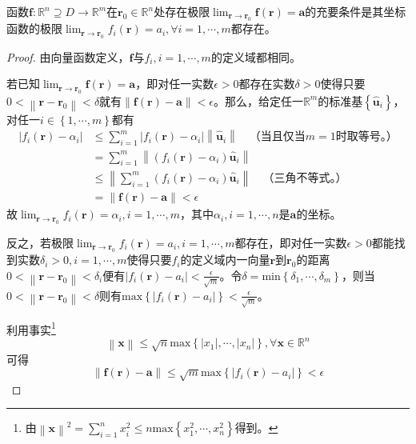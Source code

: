 \documentclass[main.tex]{subfiles}
\begin{document}
\begin{theorem}\label{thm:II.11.1}
函数$\mathbf{f}:\mathbb{R}^n\supseteq D\rightarrow\mathbb{R}^m$在$\mathbf{r}_0\in\mathbb{R}^n$处存在极限$\lim_{\mathbf{r}\to\mathbf{r}_0}\mathbf{f}\left(\mathbf{r}\right)=\mathbf{a}$的充要条件是其坐标函数的极限$\lim_{\mathbf{r}\to\mathbf{r}_0}f_i\left(\mathbf{r}\right)=a_i,\forall i=1,\cdots,m$都存在。
\end{theorem}
\begin{proof}
由向量函数定义，$\mathbf{f}$与$f_i,i=1,\cdots,m$的定义域都相同。

若已知$\lim_{\mathbf{r}\to\mathbf{r}_0}\mathbf{f}\left(\mathbf{r}\right)=\mathbf{a}$，即对任一实数$\epsilon>0$都存在实数$\delta>0$使得只要$0<\left\|\mathbf{r}-\mathbf{r}_0\right\|<\delta$就有$\left\|\mathbf{f}\left(\mathbf{r}\right)-\mathbf{a}\right\|<\epsilon$。那么，给定任一$\mathbb{R}^m$的标准基$\left\{\mathbf{\hat{u}}_i\right\}$，对任一$i\in\left\{1,\cdots,m\right\}$都有
\begin{align*}
    \left|f_i\left(\mathbf{r}\right)-\alpha_i\right|&\leq\sum_{i=1}^m\left|f_i\left(\mathbf{r}\right)-\alpha_i\right|\left\|\mathbf{\hat{u}}_i\right\|\quad\text{（当且仅当}m=1\text{时取等号。）}\\
    &=\sum_{i=1}^m\left\|\left(f_i\left(\mathbf{r}\right)-\alpha_i\right)\mathbf{\hat{u}}_i\right\|\\
    &\leq\left\|\sum_{i=1}^m\left(f_i\left(\mathbf{r}\right)-\alpha_i\right)\mathbf{\hat{u}}_i\right\|\quad\text{（三角不等式。）}\\
    &=\left\|\mathbf{f}\left(\mathbf{r}\right)-\mathbf{a}\right\|<\epsilon
\end{align*}
故$\lim_{\mathbf{r}\to\mathbf{r}_0}f_i\left(\mathbf{r}\right)=\alpha_i,i=1,\cdots,m$，其中$\alpha_i,i=1,\cdots,n$是$\mathbf{a}$的坐标。

反之，若极限$\lim_{\mathbf{r}\to\mathbf{r}_0}f_i\left(\mathbf{r}\right)=a_i,i=1,\cdots,m$都存在，即对任一实数$\epsilon>0$都能找到实数$\delta_i>0,i=1,\cdots,m$使得只要$f_i$的定义域内一向量$\mathbf{r}$到$\mathbf{r}_0$的距离$0<\left\|\mathbf{r}-\mathbf{r}_0\right\|<\delta_i$便有$\left|f_i\left(\mathbf{r}\right)-a_i\right|<\frac{\epsilon}{\sqrt{m}}$。令$\delta=\mathrm{min}\left\{\delta_1,\cdots,\delta_m\right\}$，则当$0<\left\|\mathbf{r}-\mathbf{r}_0\right\|<\delta$则有$\mathrm{max}\left\{\left|f_i\left(\mathbf{r}\right)-a_i\right|\right\}<\frac{\epsilon}{\sqrt{m}}$。

利用事实\footnote{
由$\left\|\mathbf{x}\right\|^2=\sum_{i=1}^nx_i^2\leq n\mathrm{max}\left\{x_1^2,\cdots,x_n^2\right\}$得到。
}
\[\left\|\mathbf{x}\right\|\leq\sqrt{n}\mathrm{max}\left\{\left|x_1\right|,\cdots,\left|x_n\right|\right\},\forall\mathbf{x}\in\mathbb{R}^n\]
可得
\[\left\|\mathbf{f}\left(\mathbf{r}\right)-\mathbf{a}\right\|\leq\sqrt{m}\mathrm{max}\left\{\left|f_i\left(\mathbf{r}\right)-a_i\right|\right\}<\epsilon\]
\end{proof}
\end{document}
